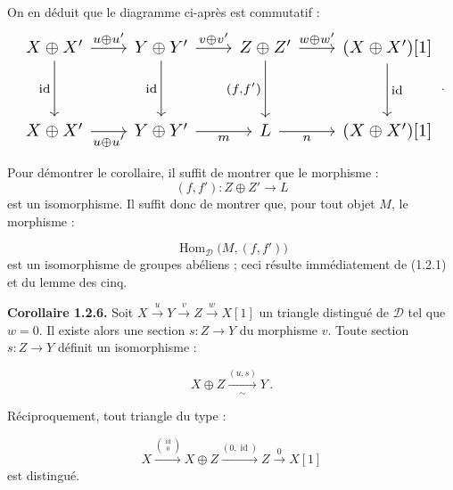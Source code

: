 \clearpage
{}%
\begingroup
\small
\setlength{\abovedisplayskip}{4pt plus 2pt minus 2pt}%
\setlength{\belowdisplayskip}{4pt plus 2pt minus 2pt}%

On en déduit que le diagramme ci-après est commutatif :
\begin{equation*}
  \resizebox{0.98\linewidth}{!}{%
    $\begin{tikzcd}[ampersand replacement=\&,column sep=2.1em,row sep=3.1em]
      X\oplus X' \arrow[r,"{u\oplus u'}"] \arrow[d,"{\operatorname{id}}"']
        \& Y\oplus Y' \arrow[r,"{v\oplus v'}"] \arrow[d,"{\operatorname{id}}"']
        \& Z\oplus Z' \arrow[r,"{w\oplus w'}"] \arrow[d,"{(f,f')}"']
        \& (X\oplus X')[1] \arrow[d,"{\operatorname{id}}"] \\
      X\oplus X' \arrow[r,"{u\oplus u'}"']
        \& Y\oplus Y' \arrow[r,"m"']
        \& L \arrow[r,"n"']
        \& (X\oplus X')[1]
    \end{tikzcd}$%
  }\,.
\end{equation*}

Pour démontrer le corollaire, il suffit de montrer que le morphisme :
\[
  (f,f')\colon Z\oplus Z'\longrightarrow L
\]
est un isomorphisme. Il suffit donc de montrer que, pour tout objet $M$, le
morphisme :

\[
  \operatorname{Hom}_{\mathcal D}\bigl(M,(f,f')\bigr)
\]
est un isomorphisme de groupes abéliens ; ceci résulte immédiatement de
(1.2.1) et du lemme des cinq.


\medskip
\noindent\textbf{Corollaire 1.2.6.}\quad
Soit
$X\xrightarrow{u}Y\xrightarrow{v}Z\xrightarrow{w}X[1]$
un triangle distingué de $\mathcal D$ tel que $w=0$. Il existe alors une
section $s\colon Z\longrightarrow Y$ du morphisme $v$. Toute section
$s\colon Z\longrightarrow Y$ définit un isomorphisme :

\[
  X\oplus Z\xrightarrow[\sim]{(u,s)}Y\,.
\]

Réciproquement, tout triangle du type :

\begin{equation}
  X\xrightarrow{\binom{\operatorname{id}}{0}}X\oplus Z
  \xrightarrow{(0,\operatorname{id})}Z\xrightarrow{0}X[1]
  \tag{1.2.6.1}
\end{equation}
est distingué.

